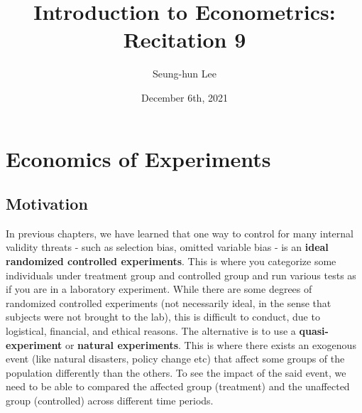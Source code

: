 \documentclass[12pt]{article}
\title{Introduction to Econometrics: Recitation 9}
\theoremstyle{definition}
\theoremstyle{property}
\theoremstyle{assumption}
\theoremstyle{example}
\theoremstyle{comment}
\begin{document}
\linespread{1.25}
\author{Seung-hun Lee}
\date{December 6th, 2021 }
\maketitle

\section{Economics of Experiments}
\subsection{Motivation}
In previous chapters, we have learned that one way to control for many internal validity threats - such as selection bias, omitted variable bias - is an \textbf{ideal randomized controlled experiments}. This is where you categorize some individuals under treatment group and controlled group and run various tests as if you are in a laboratory experiment. While there are some degrees of randomized controlled experiments (not necessarily ideal, in the sense that subjects were not brought to the lab), this is difficult to conduct, due to logistical, financial, and ethical reasons. The alternative is to use a \textbf{quasi-experiment} or \textbf{natural experiments}. This is where there exists an exogenous event (like natural disasters, policy change etc) that affect some groups of the population differently than the others.  To see the impact of the said event, we need to be able to compared the affected group (treatment) and the unaffected group (controlled) across different time periods. \par\medskip
\end{document}
